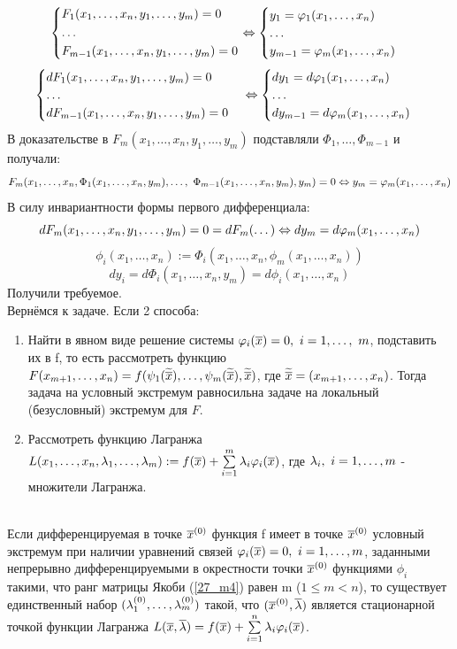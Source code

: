 \begin{note}
	\[
		\begin{cases*}
			F_1(x_1,\dots,x_n,y_1,\dots,y_m)=0\\
			\dots\\
			F_{m-1}(x_1,\dots,x_n,y_1,\dots,y_m)=0
		\end{cases*}
		\lra
		\begin{cases}
			y_1=\phi_1(x_1,\dots,x_n)\\
			\dots\\
			y_{m-1}=\phi_m(x_1,\dots,x_n)
		\end{cases}
	\]
	\[
	\begin{cases}
		dF_1(x_1,\dots,x_n,y_1,\dots,y_m)=0\\
		\dots\\
		dF_{m-1}(x_1,\dots,x_n,y_1,\dots,y_m)=0
	\end{cases}
	\Leftrightarrow
	\begin{cases}
		dy_1=d\varphi_1(x_1,\dots,x_n)\\
		\dots\\
		dy_{m-1}=d\varphi_m(x_1,\dots,x_n)
	\end{cases}
	\]
	В доказательстве в $F_m(x_1,\dots,x_n,y_1,\dots,y_m)$ подставляли $\Phi_1,\dots,\Phi_{m-1}$ и получали:
	\[F_m(x_1,\dots,x_n,\Phi_1(x_1,\dots,x_n,y_m),\dots,\ \Phi_{m-1}(x_1,\dots,x_n,y_m),y_m)=0\lra y_m=\phi_m(x_1,\dots,x_n)\]
	В силу инвариантности формы первого дифференциала:
	\[dF_m(x_1,\dots,x_n,y_1,\dots,y_m)=0=dF_m(\dots)\Leftrightarrow dy_m=d\varphi_m(x_1,\dots,x_n)\]
	\[\phi_i(x_1,\dots,x_n):=\Phi_i(x_1,\dots,x_n,\phi_m(x_1,\dots,x_n))\]
	\[dy_i=d\Phi_i(x_1,\dots,x_n,y_m)=d\phi_i(x_1,\dots,x_n)\]
	Получили требуемое.\\
	Вернёмся к задаче. Если 2 способа:
	\begin{enumerate}
		\item Найти в явном виде решение системы $\varphi_i(\overline x)=0,\ i=1,\dots,\ m$, подставить их в f, то есть рассмотреть функцию $F(x_{m+1},\dots,x_n)=f(\psi_1(\widetilde{\overline x}),\dots,\psi_m(\widetilde{\overline x}),\widetilde{\overline x})$, где $\widetilde{\overline x}=(x_{m+1},\dots,x_n)$. Тогда задача на условный экстремум равносильна задаче на локальный (безусловный) экстремум для $F$.
		\item Рассмотреть функцию Лагранжа $L(x_1,\dots,x_n,\la_1,\dots,\la_m):=f(\vx)+\sum_{i=1}^m\la_i\phi_i(\vx)$, где $\lambda_i,\ i=1,\dots,m$ - множители Лагранжа.
	\end{enumerate}
\end{note}
\begin{theorem}\label{27_th5}\\
	Если дифференцируемая в точке $\overline x^{({0})}$ функция f имеет в точке $\overline x^{({0})}$ условный экстремум при наличии уравнений связей $\varphi_i(\overline x)=0,\ i=1,\dots,m$, заданными непрерывно дифференцируемыми в окрестности точки $\overline x^{({0})}$ функциями $\phi_i$ такими, что ранг матрицы Якоби (\ref{27_m4}) равен m ($1\le m<n$), то существует единственный набор $(\lambda_1^{({0})},\dots,\lambda_m^{({0})})$ такой, что $(\overline x^{({0})},\overline{\lambda})$ является стационарной точкой функции Лагранжа $L(\vx,\v\la)=f(\vx)+\sum_{i=1}^n\la_i\phi_i(\vx)$.
\end{theorem}
